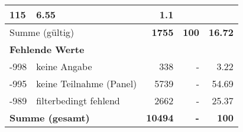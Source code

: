 \begin{longtable}{lXrrr}
       \num{115} &
       \num[round-mode=places,round-precision=2]{6.55} &
         \num[round-mode=places,round-precision=2]{1.1} \\
     \midrule
     \multicolumn{2}{l}{Summe (gültig)} &
       \textbf{\num{1755}} &
     \textbf{\num{100}} &
       \textbf{\num[round-mode=places,round-precision=2]{16.72}} \\
     \multicolumn{5}{l}{\textbf{Fehlende Werte}}\\
       -998 &
       keine Angabe &
         \num{338} &
        - &
         \num[round-mode=places,round-precision=2]{3.22} \\
       -995 &
       keine Teilnahme (Panel) &
         \num{5739} &
        - &
         \num[round-mode=places,round-precision=2]{54.69} \\
       -989 &
       filterbedingt fehlend &
         \num{2662} &
        - &
         \num[round-mode=places,round-precision=2]{25.37} \\
     \midrule
     \multicolumn{2}{l}{\textbf{Summe (gesamt)}} &
          \textbf{\num{10494}} &
        \textbf{-} &
        \textbf{\num{100}} \\
     \bottomrule
     \end{longtable}
     
